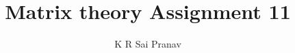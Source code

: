 \documentclass[journal,12pt,twocolumn]{IEEEtran}
\begin{document}
\makeatletter
{}
\makeatother
\let\StandardTheFigure\thefigure
\let\vec\mathbf
\renewcommand{\thefigure}{\theproblem}
\def\putbox#1#2#3{\makebox[0in][l]{\makebox[#1][l]{}\raisebox{\baselineskip}[0in][0in]{\raisebox{#2}[0in][0in]{#3}}}}
     \def\rightbox#1{\makebox[0in][r]{#1}}
     \def\centbox#1{\makebox[0in]{#1}}
     \def\topbox#1{\raisebox{-\baselineskip}[0in][0in]{#1}}
     \def\midbox#1{\raisebox{-0.5\baselineskip}[0in][0in]{#1}}
\vspace{3cm}
\title{Matrix theory Assignment 11}
\author{K R Sai Pranav}
%
%
%
% 
%
\end{document}
